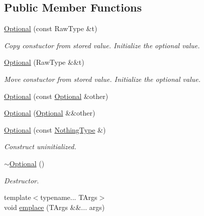 \subsection*{Public Member Functions}
\begin{DoxyCompactItemize}
\item 
\hypertarget{classOptional_af4deb96207fa2285779bbb8c073acbcd}{}\label{classOptional_af4deb96207fa2285779bbb8c073acbcd} 
\hyperlink{classOptional_af4deb96207fa2285779bbb8c073acbcd}{Optional} (const Raw\+Type \&t)
\begin{DoxyCompactList}\small\item\em Copy constuctor from stored value. Initialize the optional value. \end{DoxyCompactList}\item 
\hypertarget{classOptional_a450e6403178db88f2fd9ec3a1391d858}{}\label{classOptional_a450e6403178db88f2fd9ec3a1391d858} 
\hyperlink{classOptional_a450e6403178db88f2fd9ec3a1391d858}{Optional} (Raw\+Type \&\&t)
\begin{DoxyCompactList}\small\item\em Move constuctor from stored value. Initialize the optional value. \end{DoxyCompactList}\item 
\hyperlink{classOptional_a099b0dce0d5fedf466ca51057dd9eb5c}{Optional} (const \hyperlink{classOptional}{Optional} \&other)
\item 
\hyperlink{classOptional_a114c41318cb918540e6b0bac8159239c}{Optional} (\hyperlink{classOptional}{Optional} \&\&other)
\item 
\hypertarget{classOptional_af86726f19377893d4a73e2d05c8ca513}{}\label{classOptional_af86726f19377893d4a73e2d05c8ca513} 
\hyperlink{classOptional_af86726f19377893d4a73e2d05c8ca513}{Optional} (const \hyperlink{structNothingType}{Nothing\+Type} \&)
\begin{DoxyCompactList}\small\item\em Construct uninitialized. \end{DoxyCompactList}\item 
\hypertarget{classOptional_a45557bde636d60b1a7c3a089b4e579bb}{}\label{classOptional_a45557bde636d60b1a7c3a089b4e579bb} 
\hyperlink{classOptional_a45557bde636d60b1a7c3a089b4e579bb}{$\sim$\+Optional} ()
\begin{DoxyCompactList}\small\item\em Destructor. \end{DoxyCompactList}\item 
{\footnotesize template$<$typename... T\+Args$>$ }\\void \hyperlink{classOptional_a2e0236b5bd0e4877d7db446cf0bb784e}{emplace} (T\+Args \&\&... args)

\end{DoxyCompactItemize}
